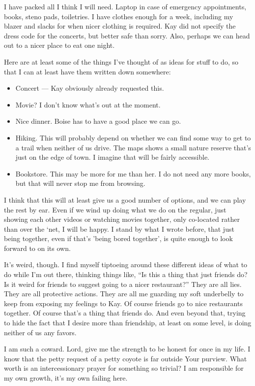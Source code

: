 I have packed all I think I will need. Laptop in case of emergency appointments, books, steno pads, toiletries. I have clothes enough for a week, including my blazer and slacks for when nicer clothing is required. Kay did not specify the dress code for the concerts, but better safe than sorry. Also, perhaps we can head out to a nicer place to eat one night.

Here are at least some of the things I've thought of as ideas for stuff to do, so that I can at least have them written down somewhere:

\begin{itemize}
\tightlist
\item
  Concert --- Kay obviously already requested this.
\item
  Movie? I don't know what's out at the moment.
\item
  Nice dinner. Boise has to have a good place we can go.
\item
  Hiking. This will probably depend on whether we can find some way to get to a trail when neither of us drive. The maps shows a small nature reserve that's just on the edge of town. I imagine that will be fairly accessible.
\item
  Bookstore. This may be more for me than her. I do not need any more books, but that will never stop me from browsing.
\end{itemize}

I think that this will at least give us a good number of options, and we can play the rest by ear. Even if we wind up doing what we do on the regular, just showing each other videos or watching movies together, only co-located rather than over the `net, I will be happy. I stand by what I wrote before, that just being together, even if that's 'being bored together', is quite enough to look forward to on its own.

It's weird, though. I find myself tiptoeing around these different ideas of what to do while I'm out there, thinking things like, ``Is this a thing that just friends do? Is it weird for friends to suggest going to a nicer restaurant?'' They are all lies. They are all protective actions. They are all me guarding my soft underbelly to keep from exposing my feelings to Kay. Of course friends go to nice restaurants together. Of course that's a thing that friends do. And even beyond that, trying to hide the fact that I desire more than friendship, at least on some level, is doing neither of us any favors.

I am such a coward. Lord, give me the strength to be honest for once in my life. I know that the petty request of a petty coyote is far outside Your purview. What worth is an intercessionary prayer for something so trivial? I am responsible for my own growth, it's my own failing here.

